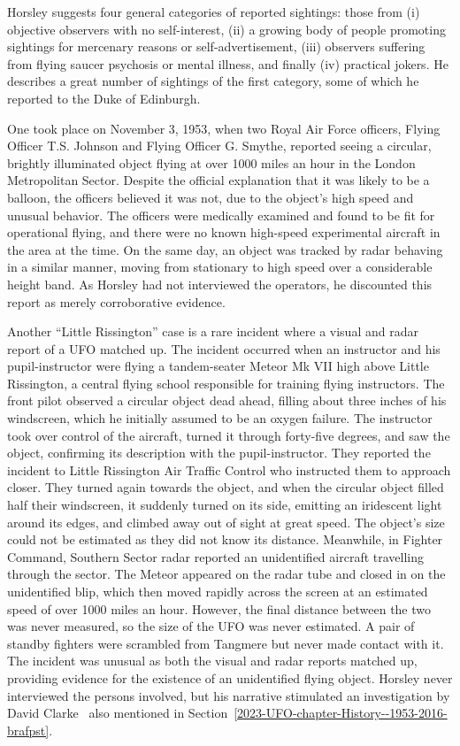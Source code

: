Horsley suggests four general categories of reported sightings: those from (i) objective observers with no self-interest, (ii) a growing body of people promoting sightings for mercenary reasons or self-advertisement, (iii) observers suffering from flying saucer psychosis or mental illness, and finally (iv) practical jokers.
He describes a great number of sightings of the first category, some of which he reported to the Duke of Edinburgh.


One took place on November 3, 1953, when two Royal Air Force officers, Flying Officer T.S. Johnson and Flying Officer G. Smythe,
reported seeing a circular, brightly illuminated object flying at over 1000 miles an hour in the London Metropolitan Sector.
Despite the official explanation that it was likely to be a balloon,
the officers believed it was not, due to the object's high speed and unusual behavior.
The officers were medically examined and found to be fit for operational flying,
and there were no known high-speed experimental aircraft in the area at the time.
On the same day, an object was tracked
by radar behaving in a similar manner, moving from stationary to high
speed over a considerable height band. As Horsley had not interviewed the operators, he
discounted this report as merely corroborative evidence.

Another ``Little Rissington'' case is a rare incident where a visual and radar report of a UFO matched up.
The incident occurred when an instructor and his pupil-instructor were flying a tandem-seater Meteor Mk VII high above Little Rissington,
a central flying school responsible for training flying instructors.
The front pilot observed a circular object dead ahead, filling about three inches of his windscreen,
which he initially assumed to be an oxygen failure.
 The instructor took over control of the aircraft, turned it through forty-five degrees,
and saw the object, confirming its description with the pupil-instructor.
 They reported the incident to Little Rissington Air Traffic Control who instructed them to approach closer.
They turned again towards the object, and when the circular object filled half their windscreen, it suddenly turned on its side,
emitting an iridescent light around its edges, and climbed away out of sight at great speed.
The object's size could not be estimated as they did not know its distance.
Meanwhile, in Fighter Command, Southern Sector radar reported an unidentified aircraft travelling through the sector.
The Meteor appeared on the radar tube and closed in on the unidentified blip, which then moved rapidly across the screen at an estimated speed of over 1000 miles an hour.
However, the final distance between the two was never measured, so the size of the UFO was never estimated.
A pair of standby fighters were scrambled from Tangmere but never made contact with it.
The incident was unusual as both the visual and radar reports matched up, providing evidence for the existence of an unidentified flying object.
Horsley never interviewed the persons involved, but his narrative stimulated an investigation by David Clarke~\cite{Clarke-Mainbrace-2020Dec,Team2022Sep}
also mentioned in Section~\ref{2023-UFO-chapter-History--1953-2016-brafpst}.



